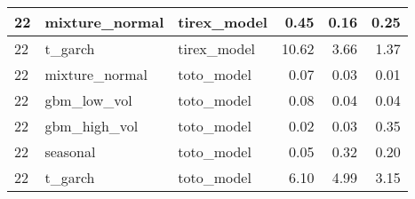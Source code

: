 {\begin{tabular}{lllrrr}
22 & mixture\_normal & tirex\_model & 0.45 & 0.16 & 0.25 \\
\midrule
22 & t\_garch & tirex\_model & 10.62 & 3.66 & 1.37 \\
\midrule
22 & mixture\_normal & toto\_model & 0.07 & 0.03 & 0.01 \\
\midrule
22 & gbm\_low\_vol & toto\_model & 0.08 & 0.04 & 0.04 \\
\midrule
22 & gbm\_high\_vol & toto\_model & 0.02 & 0.03 & 0.35 \\
\midrule
22 & seasonal & toto\_model & 0.05 & 0.32 & 0.20 \\
\midrule
22 & t\_garch & toto\_model & 6.10 & 4.99 & 3.15 \\
\bottomrule
\end{tabular}
}